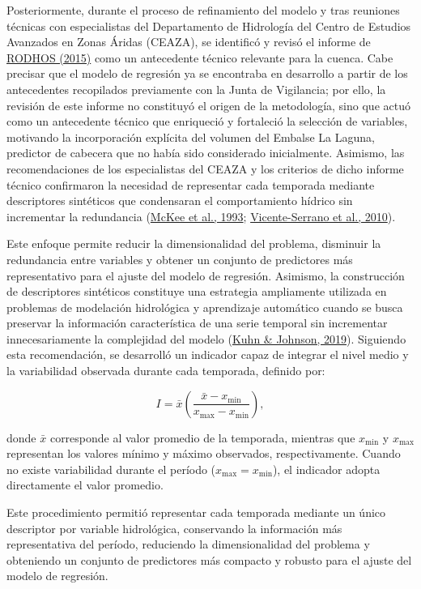 \documentclass[12pt]{report}
\newcommand{\citeref}[2]{\hyperlink{ref:#1}{#2}}
\begin{document}
Posteriormente, durante el proceso de refinamiento del modelo y tras reuniones técnicas con especialistas del Departamento de Hidrología del Centro de Estudios Avanzados en Zonas Áridas (CEAZA), se identificó y revisó el informe de \citeref{rodhos2015}{RODHOS (2015)} como un antecedente técnico relevante para la cuenca. Cabe precisar que el modelo de regresión ya se encontraba en desarrollo a partir de los antecedentes recopilados previamente con la Junta de Vigilancia; por ello, la revisión de este informe no constituyó el origen de la metodología, sino que actuó como un antecedente técnico que enriqueció y fortaleció la selección de variables, motivando la incorporación explícita del volumen del Embalse La Laguna, predictor de cabecera que no había sido considerado inicialmente. Asimismo, las recomendaciones de los especialistas del CEAZA y los criterios de dicho informe técnico confirmaron la necesidad de representar cada temporada mediante descriptores sintéticos que condensaran el comportamiento hídrico sin incrementar la redundancia (\citeref{mckee1993}{McKee et al., 1993}; \citeref{vicente2010}{Vicente-Serrano et al., 2010}).

Este enfoque permite reducir la dimensionalidad del problema, disminuir la redundancia entre variables y obtener un conjunto de predictores más representativo para el ajuste del modelo de regresión. Asimismo, la construcción de descriptores sintéticos constituye una estrategia ampliamente utilizada en problemas de modelación hidrológica y aprendizaje automático cuando se busca preservar la información característica de una serie temporal sin incrementar innecesariamente la complejidad del modelo (\citeref{kuhn2019}{Kuhn \& Johnson, 2019}). Siguiendo esta recomendación, se desarrolló un indicador capaz de integrar el nivel medio y la variabilidad observada durante cada temporada, definido por:

\[
I=
\bar{x}
\left(
\frac{\bar{x}-x_{\min}}
{x_{\max}-x_{\min}}
\right),
\]

donde $\bar{x}$ corresponde al valor promedio de la temporada, mientras que $x_{\min}$ y $x_{\max}$ representan los valores mínimo y máximo observados, respectivamente. Cuando no existe variabilidad durante el período ($x_{\max}=x_{\min}$), el indicador adopta directamente el valor promedio.

Este procedimiento permitió representar cada temporada mediante un único descriptor por variable hidrológica, conservando la información más representativa del período, reduciendo la dimensionalidad del problema y obteniendo un conjunto de predictores más compacto y robusto para el ajuste del modelo de regresión.
\end{document}
